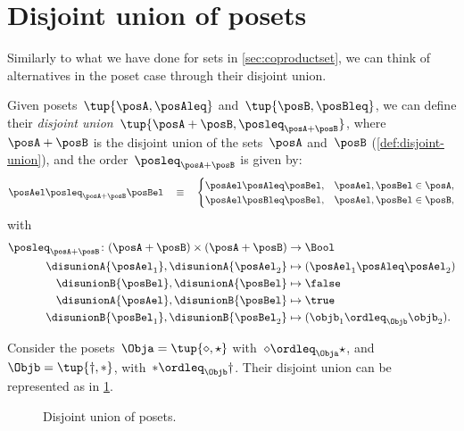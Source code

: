 
\section{Disjoint union of posets}

Similarly to what we have done for sets in \cref{sec:coproductset}, we can think of alternatives in the poset case through their disjoint union.

\begin{definition}
  Given posets~$\tup{\posA, \posAleq}$ and~$\tup{\posB, \posBleq}$, we can define their \emph{disjoint union}~$\tup{\posA + \posB, \posleq_{\posA + \posB}}$, where~$\posA + \posB$
  is the disjoint union of the sets~$\posA$ and~$\posB$ (\cref{def:disjoint-union}), and the
  order~$\posleq_{\posA + \posB}$ is given by:
  \begin{equation}
    \posAel \posleq_{\posA + \posB} \posBel \quad\equiv\quad
    \begin{cases}
      \posAel \posAleq \posBel, & \posAel,\posBel \in \posA, \\
      \posAel \posBleq \posBel, & \posAel,\posBel \in \posB,
    \end{cases}
  \end{equation}
  with
  \begin{equation}
    \begin{aligned}
      \posleq_{\posA+\posB}\colon (\posA+\posB)\times (\posA+\posB)&\to \Bool\\
      \disunionA{\posAel_1},\disunionA{\posAel_2}&\mapsto (\posAel_1\posAleq \posAel_2)\\
      \disunionB{\posBel},\disunionA{\posBel}&\mapsto \false\\
      \disunionA{\posAel},\disunionB{\posBel}&\mapsto \true\\
      \disunionB{\posBel_1},\disunionB{\posBel_2}&\mapsto (\objb_1\ordleq_\Objb \objb_2).
    \end{aligned}
  \end{equation}
\end{definition}


\begin{example}
  Consider the posets~$\Obja=\tup{\diamond, \star}$ with~$\diamond \ordleq_\Obja \star$, and~$\Objb=\tup{\dagger,\ast}$, with~$\ast \ordleq_\Objb \dagger$. Their disjoint union can be represented as in \cref{fig:poset-coproduct}.

  \begin{figure}[h!]
    \centering
    \caption{Disjoint union of posets. }
    \label{fig:poset-coproduct}
  \end{figure}
\end{example}
